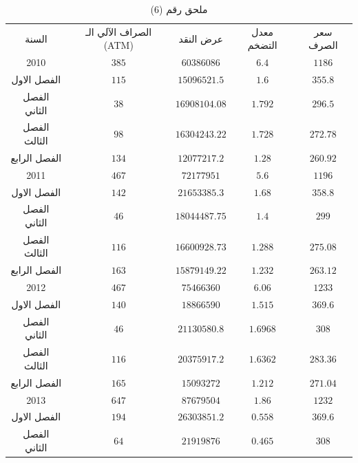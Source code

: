 \documentclass[10pt,a4paper]{report}
\begin{document}
	\begin{longtable}{|c|c|c|c|c|}
	\captionsetup{font=Large}
	\caption*{ملحق رقم (6)} \\
	\hline
	\rowcolor[HTML]{DAE8FC} 
	السنة        & الصراف الآلي الـ (ATM) & عرض النقد     & معدل التضخم & سعر الصرف \\ \hline
	2010         & $385$                 & $60386086$    & $6.4$       & $1186$    \\ \hline
	الفصل الاول  & $115$                 & $15096521.5$  & $1.6$       & $355.8$   \\ \hline
	الفصل الثاني & $38$                  & $16908104.08$ & $1.792$     & $296.5$   \\ \hline
	الفصل الثالث & $98$                  & $16304243.22$ & $1.728$     & $272.78$  \\ \hline
	الفصل الرابع & $134$                 & $12077217.2$  & $1.28$      & $260.92$  \\ \hline
	2011         & $467$                 & $72177951$    & $5.6$       & $1196$    \\ \hline
	الفصل الاول  & $142$                 & $21653385.3$  & $1.68$      & $358.8$   \\ \hline
	الفصل الثاني & $46$                  & $18044487.75$ & $1.4$       & $299$     \\ \hline
	الفصل الثالث & $116$                 & $16600928.73$ & $1.288$     & $275.08$  \\ \hline
	الفصل الرابع & $163$                 & $15879149.22$ & $1.232$     & $263.12$  \\ \hline
	2012         & $467$                 & $75466360$    & $6.06$      & $1233$    \\ \hline
	الفصل الاول  & $140$                 & $18866590$    & $1.515$     & $369.6$   \\ \hline
	الفصل الثاني & $46$                  & $21130580.8$  & $1.6968$    & $308$     \\ \hline
	الفصل الثالث & $116$                 & $20375917.2$  & $1.6362$    & $283.36$  \\ \hline
	الفصل الرابع & $165$                 & $15093272$    & $1.212$     & $271.04$  \\ \hline
	2013         & $647$                 & $87679504$    & $1.86$      & $1232$    \\ \hline
	الفصل الاول  & $194$                 & $26303851.2$  & $0.558$     & $369.6$   \\ \hline
	الفصل الثاني & $64$                  & $21919876$    & $0.465$     & $308$     \\ \hline

\end{longtable}
\end{document}
